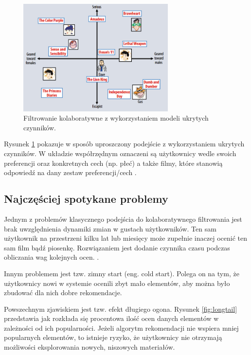 \documentclass[twoside]{iisthesis}
\begin{document}
	  \begin{figure}[!ht] 
	  	\centering
	  	\includegraphics[width=0.7\textwidth]{cf2}
	  	\caption{Filtrowanie kolaboratywne z wykorzystaniem modeli ukrytych czynników\protect\cite{id:MatrixFactorizationTechniquesForRecommenderSystems}.}
	  	\label{fig:cf2}
	  \end{figure}
	 
	 Rysunek \ref{fig:cf2} pokazuje w sposób uproszczony podejście z wykorzystaniem ukrytych czynników. W układzie współrzędnym oznaczeni są użytkownicy wedle swoich preferencji oraz konkretnych cech (np. płeć) a także filmy, które stanowią odpowiedź na dany zestaw preferencji/cech \cite{id:MatrixFactorizationTechniquesForRecommenderSystems}. 
	 	 
	 \subsection{Najczęściej spotykane problemy}
	 
	 Jednym z problemów klasycznego podejścia do kolaboratywnego filtrowania jest brak uwzględnienia dynamiki zmian w gustach użytkowników. Ten sam użytkownik na przestrzeni kilku lat lub miesięcy może zupełnie inaczej ocenić ten sam film bądź piosenkę. Rozwiązaniem jest dodanie czynnika czasu podczas obliczania wag kolejnych ocen. \cite{id:NewRecommentationAlgoritmBasedOnSocialNetwork}\cite{id:NextSongRecommendationWithTemporalDynamics}\cite{id:MatrixFactorizationTechniquesForRecommenderSystems}.
	 
	 Innym problemem jest tzw. zimny start (eng. cold start). Polega on na tym, że użytkownicy nowi w systemie ocenili zbyt mało elementów, aby można było zbudować dla nich dobre rekomendacje\cite{id:zhang2015hybrid}\cite{id:RubensRecSysHB2010}.
	 
	 Powszechnym zjawiskiem jest tzw. efekt długiego ogona. Rysunek \ref{fig:longtail} przedstawia jak rozkłada się procentowa ilość ocen danych elementów w zależności od ich popularności. Jeżeli algorytm rekomendacji nie wspiera mniej popularnych elementów, to istnieje ryzyko, że użytkownicy nie otrzymają możliwości eksplorowania nowych, niszowych materiałów\cite{id:RubensRecSysHB2010}\cite{id:celma2010music}.
	 
\end{document}
